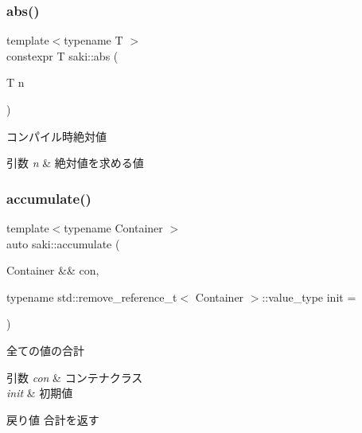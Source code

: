 \subsubsection{\texorpdfstring{abs()}{abs()}}
{\footnotesize\ttfamily template$<$typename T $>$ \\
constexpr T saki\+::abs (\begin{DoxyParamCaption}\item[{T}]{n }\end{DoxyParamCaption})}



コンパイル時絶対値 


\begin{DoxyParams}{引数}
{\em n} & 絶対値を求める値 \\
\hline
\end{DoxyParams}
\mbox{\label{namespacesaki_a981cc67b0d421b1836678c3ac4069afd}} 
\subsubsection{\texorpdfstring{accumulate()}{accumulate()}\hspace{0.1cm}{\footnotesize\ttfamily [1/2]}}
{\footnotesize\ttfamily template$<$typename Container $>$ \\
auto saki\+::accumulate (\begin{DoxyParamCaption}\item[{Container \&\&}]{con,  }\item[{typename std\+::remove\+\_\+reference\+\_\+t$<$ Container $>$\+::value\+\_\+type}]{init = {} }\end{DoxyParamCaption})}



全ての値の合計 


\begin{DoxyParams}{引数}
{\em con} & コンテナクラス \\
\hline
{\em init} & 初期値 \\
\hline
\end{DoxyParams}
\begin{DoxyReturn}{戻り値}
合計を返す 
\end{DoxyReturn}
\mbox{\label{namespacesaki_acb8c3f650d3b5d3b06259b91bd7ad85d}} 
